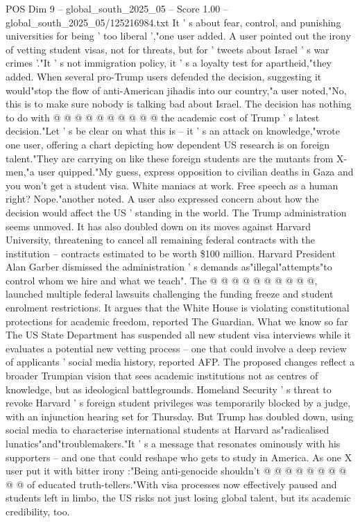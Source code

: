 \begin{textsample}{POS Dim 9 – global\_south\_2025\_05 – Score 1.00 – global\_south\_2025\_05/125216984.txt}
It ' s about fear, control, and punishing universities for being ' too liberal ',"one user added.
A user pointed out the irony of vetting student visas, not for threats, but for ' tweets about Israel ' s war crimes '."It ' s not immigration policy, it ' s a loyalty test for apartheid,"they added.
When several pro-Trump users defended the decision, suggesting it would"stop the flow of anti-American jihadis into our country,"a user noted,"No, this is to make sure nobody is talking bad about Israel.
The decision has nothing to do with @ @ @ @ @ @ @ @ @ @ the academic cost of Trump ' s latest decision."Let ' s be clear on what this is -- it ' s an attack on knowledge,"wrote one user, offering a chart depicting how dependent US research is on foreign talent."They are carrying on like these foreign students are the mutants from X-men,"a user quipped."My guess, express opposition to civilian deaths in Gaza and you won't get a student visa.
White maniacs at work.
Free speech as a human right?
Nope."another noted.
A user also expressed concern about how the decision would affect the US ' standing in the world.
The Trump administration seems unmoved.
It has also doubled down on its moves against Harvard University, threatening to cancel all remaining federal contracts with the institution -- contracts estimated to be worth \$100 million.
Harvard President Alan Garber dismissed the administration ' s demands as"illegal"attempts"to control whom we hire and what we teach".
The @ @ @ @ @ @ @ @ @ @, launched multiple federal lawsuits challenging the funding freeze and student enrolment restrictions.
It argues that the White House is violating constitutional protections for academic freedom, reported The Guardian.
What we know so far The US State Department has suspended all new student visa interviews while it evaluates a potential new vetting process -- one that could involve a deep review of applicants ' social media history, reported AFP.
The proposed changes reflect a broader Trumpian vision that sees academic institutions not as centres of knowledge, but as ideological battlegrounds.
Homeland Security ' s threat to revoke Harvard ' s foreign student privileges was temporarily blocked by a judge, with an injunction hearing set for Thursday.
But Trump has doubled down, using social media to characterise international students at Harvard as"radicalised lunatics"and"troublemakers."It ' s a message that resonates ominously with his supporters -- and one that could reshape who gets to study in America.
As one X user put it with bitter irony :"Being anti-genocide shouldn't @ @ @ @ @ @ @ @ @ @ of educated truth-tellers."With visa processes now effectively paused and students left in limbo, the US risks not just losing global talent, but its academic credibility, too.

\end{textsample}
